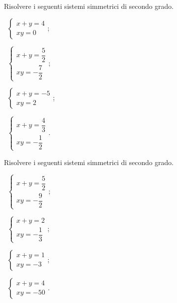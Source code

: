 \begin{esercizio}[\Ast]
 \label{ese:6.26}
Risolvere i seguenti sistemi simmetrici di secondo grado.
\begin{multicols}{2}
 \begin{enumeratea}
 \item~$\left\{\begin{array}{l}x+y=4\\{xy}=0 \end{array}\right.$;
 \item~$\left\{\begin{array}{l}x+y=\dfrac 5 2\\{xy}=-\dfrac 7 2\end{array}\right.$;
 \item~$\left\{\begin{array}{l}x+y=-5\\{xy}=2 \end{array}\right.$;
 \item~$\left\{\begin{array}{l}x+y=\dfrac 4 3\\{xy}=-\dfrac 1 2 \end{array}\right.$.
 \end{enumeratea}
 \end{multicols}
\end{esercizio}

\begin{esercizio}[\Ast]
 \label{ese:6.27}
Risolvere i seguenti sistemi simmetrici di secondo grado.
\begin{multicols}{2}
 \begin{enumeratea}
 \item~$\left\{\begin{array}{l}x+y=\dfrac 5 2\\{xy}=-\dfrac 9 2\end{array}\right.$;
 \item~$\left\{\begin{array}{l}x+y=2\\{xy}=-\dfrac 1 3\end{array}\right.$;
 \item~$\left\{\begin{array}{l}x+y=1\\{xy}=-3\end{array}\right.$;
 \item~$\left\{\begin{array}{l}x+y=4\\{xy}=-50\end{array}\right.$.
 \end{enumeratea}
 \end{multicols}
\end{esercizio}

